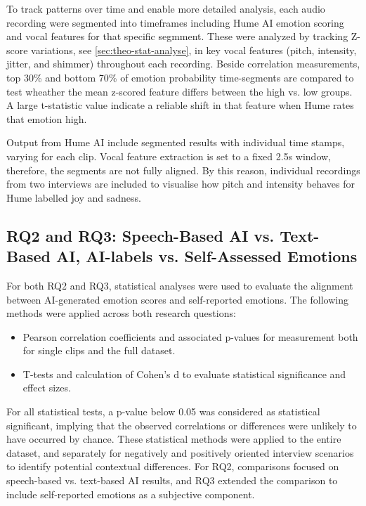 To track patterns over time and enable more detailed analysis, each audio recording were segmented into timeframes including Hume AI emotion scoring and vocal features for that specific segmment. These were analyzed by tracking Z-score variations, see \ref{sec:theo-stat-analyse}, in key vocal features (pitch, intensity, jitter, and shimmer) throughout each recording. 
Beside correlation measurements, top 30\% and bottom 70\% of emotion probability time-segments are compared to test wheather the mean z-scored feature differs between the high vs. low groups. 
A large t-statistic value indicate a reliable shift in that feature when Hume rates that emotion high.

Output from Hume AI include segmented results with individual time stamps, varying for each clip. Vocal feature extraction is set to a fixed 2.5s window, therefore, the segments are not fully aligned. 
By this reason, individual recordings from two interviews are included to visualise how pitch and intensity behaves for Hume labelled joy and sadness. 

\subsection{RQ2 and RQ3: Speech-Based AI vs. Text-Based AI, AI-labels vs. Self-Assessed Emotions}
For both RQ2 and RQ3, statistical analyses were used to evaluate the alignment between AI-generated emotion scores and self-reported emotions. The following methods were applied across both research questions:
\begin{itemize}
    \item Pearson correlation coefficients and associated p-values for measurement both for single clips and the full dataset. 
    \item T-tests and calculation of Cohen's d to evaluate statistical significance and effect sizes. 
\end{itemize}
For all statistical tests, a p-value below 0.05 was considered as statistical significant, implying that the observed correlations or differences were unlikely to have occurred by chance. 
These statistical methods were applied to the entire dataset, and separately for negatively and positively oriented interview scenarios to identify potential contextual differences.
For RQ2, comparisons focused on speech-based vs. text-based AI results, and RQ3 extended the comparison to include self-reported emotions as a subjective component.

